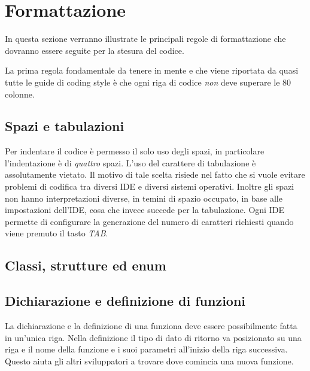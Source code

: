 %
%

\section{Formattazione}\label{sec:formatting}

In questa sezione verranno illustrate le principali regole di formattazione che dovranno essere seguite per la stesura del codice.

La prima regola fondamentale da tenere in mente e che viene riportata da quasi tutte le guide di coding style\cite{codestyle:google,codestyle:geotechnical,codestyle:quantum} è che ogni riga di codice \emph{non} deve superare le 80 colonne.

\subsection{Spazi e tabulazioni}

Per indentare il codice è permesso il solo uso degli spazi, in particolare l'indentazione è di \emph{quattro} spazi.
L'uso del carattere di tabulazione è assolutamente vietato.
Il motivo di tale scelta risiede nel fatto che si vuole evitare problemi di codifica tra diversi IDE e diversi sistemi operativi.
Inoltre gli spazi non hanno interpretazioni diverse, in temini di spazio occupato, in base alle impostazioni dell'IDE, cosa che invece succede per la tabulazione.
Ogni IDE permette di configurare la generazione del numero di caratteri richiesti quando viene premuto il tasto \emph{TAB}.

\subsection{Classi, strutture ed enum}


\subsection{Dichiarazione e definizione di funzioni}

La dichiarazione e la definizione di una funziona deve essere possibilmente fatta in un'unica riga.
Nella definizione il tipo di dato di ritorno va posizionato su una riga e il nome della funzione e i suoi parametri all'inizio della riga successiva.
Questo aiuta gli altri sviluppatori a trovare dove comincia una nuova funzione.

